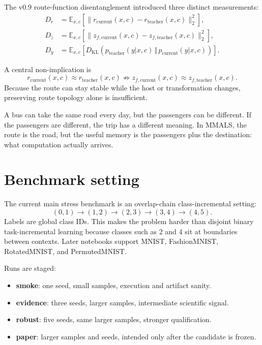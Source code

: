 \documentclass[11pt]{article}
\newcommand{\mmals}{\textsc{MMALS}}
\newcommand{\Dr}{D_r}
\newcommand{\Dz}{D_z}
\newcommand{\Dy}{D_y}
\begin{document}
The v0.9 route-function disentanglement introduced three distinct measurements:
\begin{align}
  \Dr &= \mathbb{E}_{x,c}\left[\lVert r_{\mathrm{current}}(x,c) - r_{\mathrm{teacher}}(x,c) \rVert_2^2\right],\\
  \Dz &= \mathbb{E}_{x,c}\left[\lVert z_{f,\mathrm{current}}(x,c) - z_{f,\mathrm{teacher}}(x,c) \rVert_2^2\right],\\
  \Dy &= \mathbb{E}_{x,c}\left[D_{\mathrm{KL}}\left(p_{\mathrm{teacher}}(y|x,c)\,\Vert\,p_{\mathrm{current}}(y|x,c)\right)\right].
\end{align}

A central non-implication is
\begin{equation}
  r_{\mathrm{current}}(x,c) \approx r_{\mathrm{teacher}}(x,c)
  \not\Rightarrow
  z_{f,\mathrm{current}}(x,c) \approx z_{f,\mathrm{teacher}}(x,c).
\end{equation}
Because the route can stay stable while the host or transformation changes, preserving route topology alone is insufficient.

\begin{kidbox}
A bus can take the same road every day, but the passengers can be different. If the passengers are different, the trip has a different meaning. In \mmals, the route is the road, but the useful memory is the passengers plus the destination: what computation actually arrives.
\end{kidbox}

\section{Benchmark setting}

The current main stress benchmark is an overlap-chain class-incremental setting:
\begin{equation}
(0,1) \rightarrow (1,2) \rightarrow (2,3) \rightarrow (3,4) \rightarrow (4,5).
\end{equation}
Labels are global class IDs. This makes the problem harder than disjoint binary task-incremental learning because classes such as 2 and 4 sit at boundaries between contexts. Later notebooks support MNIST, FashionMNIST, RotatedMNIST, and PermutedMNIST.

Runs are staged:
\begin{itemize}[leftmargin=*]
  \item \textbf{smoke}: one seed, small samples, execution and artifact sanity.
  \item \textbf{evidence}: three seeds, larger samples, intermediate scientific signal.
  \item \textbf{robust}: five seeds, same larger samples, stronger qualification.
  \item \textbf{paper}: larger samples and seeds, intended only after the candidate is frozen.
\end{itemize}
\end{document}
